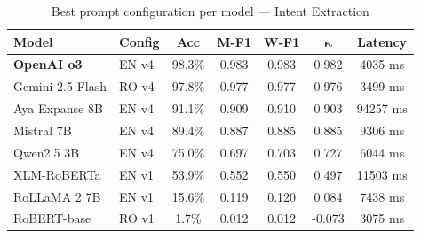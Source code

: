 \begin{table}[H]
\centering
\footnotesize
\caption{Best prompt configuration per model — Intent Extraction}
\label{tab:intent-best}
\begin{tabular}{llccccc}
\toprule
\textbf{Model} & \textbf{Config} & \textbf{Acc} & \textbf{M-F1} & \textbf{W-F1} & $\boldsymbol{\kappa}$ & \textbf{Latency} \\
\midrule
\textbf{OpenAI o3} & EN v4 & 98.3\% & 0.983 & 0.983 & 0.982 & 4035 ms \\
Gemini 2.5 Flash & RO v4 & 97.8\% & 0.977 & 0.977 & 0.976 & 3499 ms \\
Aya Expanse 8B & EN v4 & 91.1\% & 0.909 & 0.910 & 0.903 & 94257 ms \\
Mistral 7B & EN v4 & 89.4\% & 0.887 & 0.885 & 0.885 & 9306 ms \\
Qwen2.5 3B & EN v4 & 75.0\% & 0.697 & 0.703 & 0.727 & 6044 ms \\
XLM-RoBERTa & EN v1 & 53.9\% & 0.552 & 0.550 & 0.497 & 11503 ms \\
RoLLaMA 2 7B & EN v1 & 15.6\% & 0.119 & 0.120 & 0.084 & 7438 ms \\
RoBERT-base & RO v1 & 1.7\% & 0.012 & 0.012 & -0.073 & 3075 ms \\
\bottomrule
\end{tabular}
\end{table}
